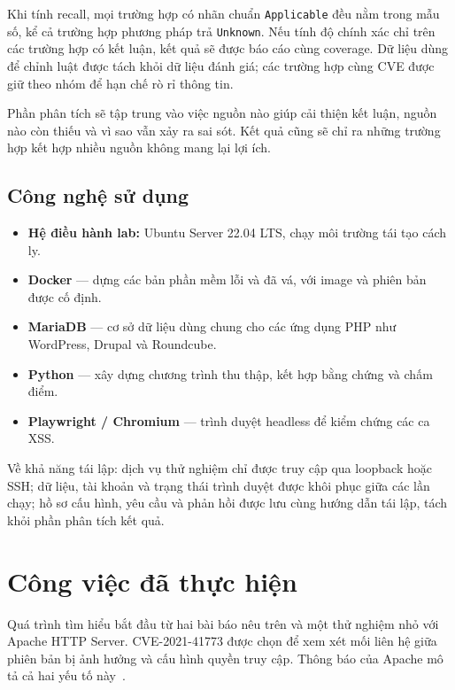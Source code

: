 \documentclass[11pt,a4paper]{article}
\begin{document}
Khi tính recall, mọi trường hợp có nhãn chuẩn \texttt{Applicable} đều nằm trong mẫu số, kể cả trường hợp phương pháp trả \texttt{Unknown}. Nếu tính độ chính xác chỉ trên các trường hợp có kết luận, kết quả sẽ được báo cáo cùng coverage. Dữ liệu dùng để chỉnh luật được tách khỏi dữ liệu đánh giá; các trường hợp cùng CVE được giữ theo nhóm để hạn chế rò rỉ thông tin.

Phần phân tích sẽ tập trung vào việc nguồn nào giúp cải thiện kết luận, nguồn nào còn thiếu và vì sao vẫn xảy ra sai sót. Kết quả cũng sẽ chỉ ra những trường hợp kết hợp nhiều nguồn không mang lại lợi ích.

\subsection{Công nghệ sử dụng}

\begin{itemize}
  \item \textbf{Hệ điều hành lab:} Ubuntu Server 22.04 LTS, chạy môi trường tái tạo cách ly.
  \item \textbf{Docker} — dựng các bản phần mềm lỗi và đã vá, với image và phiên bản được cố định.
  \item \textbf{MariaDB} — cơ sở dữ liệu dùng chung cho các ứng dụng PHP như WordPress, Drupal và Roundcube.
  \item \textbf{Python} — xây dựng chương trình thu thập, kết hợp bằng chứng và chấm điểm.
  \item \textbf{Playwright / Chromium} — trình duyệt headless để kiểm chứng các ca XSS.
\end{itemize}

Về khả năng tái lập: dịch vụ thử nghiệm chỉ được truy cập qua loopback hoặc SSH; dữ liệu, tài khoản và trạng thái trình duyệt được khôi phục giữa các lần chạy; hồ sơ cấu hình, yêu cầu và phản hồi được lưu cùng hướng dẫn tái lập, tách khỏi phần phân tích kết quả.

\section{Công việc đã thực hiện}

Quá trình tìm hiểu bắt đầu từ hai bài báo nêu trên và một thử nghiệm nhỏ với Apache HTTP Server. CVE-2021-41773 được chọn để xem xét mối liên hệ giữa phiên bản bị ảnh hưởng và cấu hình quyền truy cập. Thông báo của Apache mô tả cả hai yếu tố này~\cite{apache}.
\end{document}
